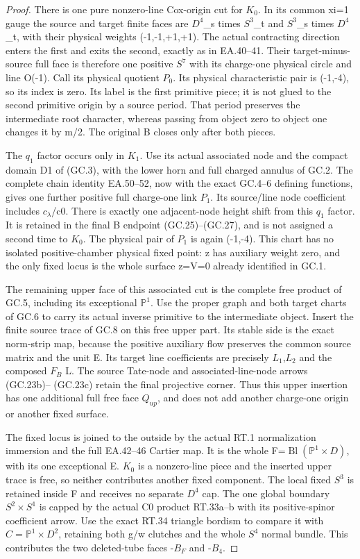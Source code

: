 \begin{proof}
There is one pure nonzero-line Cox-origin cut for \(K_0\). In its
common xi=1 gauge the source and target finite faces are
\(D^4\)\_s times \(S^3\)\_t and \(S^3\)\_s times \(D^4\)\_t, with their physical
weights (-1,-1,+1,+1). The actual contracting direction enters
the first and exits the second, exactly as in EA.40--41.
Their target-minus-source full face is therefore one positive
\(S^7\) with its charge-one physical circle and line O(-1).
Call its physical quotient \(P_0\). Its physical characteristic pair
is (-1,-4), so its index is zero. Its label is the first primitive
piece; it is not glued to the second primitive origin by a source
period. That period preserves the intermediate root character,
whereas passing from object zero to object one changes it by
m/2. The original B closes only after both pieces.

The \(q_1\) factor occurs only in \(K_1\). Use its actual associated node
and the compact domain D1 of (GC.3), with the lower horn and
full charged annulus of GC.2. The complete chain identity
EA.50--52, now with the exact GC.4--6 defining functions, gives
one further positive full charge-one link \(P_1\). Its source/line
node coefficient includes \(c_{\lambda}\)/c0. There is exactly one
adjacent-node height shift from this \(q_1\) factor. It is retained
in the final B endpoint (GC.25)--(GC.27), and is not assigned
a second time to \(K_0\). The physical pair of \(P_1\) is again (-1,-4).
This chart has no isolated positive-chamber physical fixed point:
z has auxiliary weight zero, and the only fixed locus is the
whole surface z=V=0 already identified in GC.1.

The remaining upper face of this associated cut is the complete
free product of GC.5, including its exceptional \(\mathbb P^1\). Use the
proper graph and both target charts of GC.6 to carry its actual
inverse primitive to the intermediate object. Insert the finite
source trace of GC.8 on this free upper part. Its stable side
is the exact norm-strip map, because the positive auxiliary flow
preserves the common source matrix and the unit E. Its target
line coefficients are precisely \(L_1\),\(L_2\) and the composed \(F_{B}\) L.
The source Tate-node and associated-line-node arrows (GC.23b)--
(GC.23c) retain the final projective corner. Thus this upper
insertion has one additional full free face \(Q_{up}\), and does not
add another charge-one origin or another fixed surface.

The fixed locus is joined to the outside by the actual RT.1
normalization immersion and the full EA.42--46 Cartier map.
It is the whole F=\(\operatorname{Bl}(\mathbb P^1\times D)\), with its one exceptional E.
\(K_0\) is a nonzero-line piece and the inserted upper trace is free,
so neither contributes another fixed component. The local fixed
\(S^3\) is retained inside F and receives no separate \(D^4\) cap. The
one global boundary \(S^2\times S^1\) is capped by the actual C0
product RT.33a--b with its positive-spinor coefficient arrow.
Use the exact RT.34 triangle bordism to compare it with \(C=\mathbb P^1\times D^2\), retaining both g/w clutches and the whole \(S^4\) normal
bundle. This contributes the two deleted-tube faces -\(B_F\) and -\(B_4\).


\end{proof}
